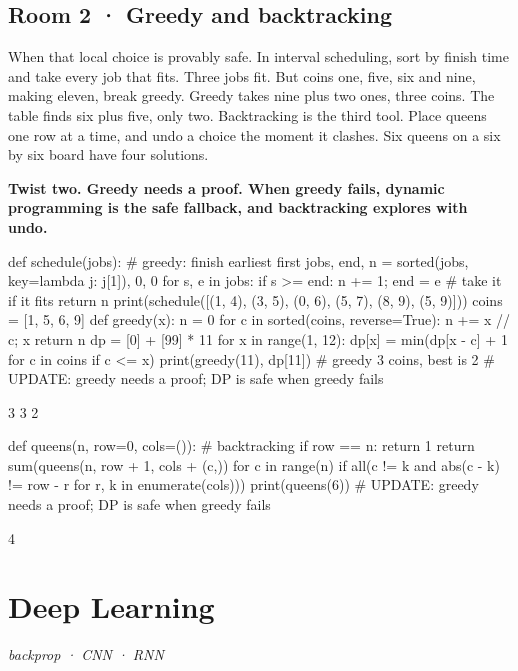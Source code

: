 \documentclass[11pt,a4paper]{report}
\begin{document}
\section*{Room 2 · Greedy and backtracking}
When that local choice is provably safe. In interval scheduling, sort by finish time and take every job that fits. Three jobs fit. But coins one, five, six and nine, making eleven, break greedy. Greedy takes nine plus two ones, three coins. The table finds six plus five, only two. Backtracking is the third tool. Place queens one row at a time, and undo a choice the moment it clashes. Six queens on a six by six board have four solutions.
\begin{tcolorbox}[colback=yellow!12,colframe=orange!70!black,boxrule=0.4pt,left=4pt,right=4pt,top=2pt,bottom=2pt]\textbf{Twist two. Greedy needs a proof. When greedy fails, dynamic programming is the safe fallback, and backtracking explores with undo.}\end{tcolorbox}
\begin{Code}
def schedule(jobs):                        # greedy: finish earliest first
    jobs, end, n = sorted(jobs, key=lambda j: j[1]), 0, 0
    for s, e in jobs:
        if s >= end: n += 1; end = e       # take it if it fits
    return n
print(schedule([(1, 4), (3, 5), (0, 6), (5, 7), (8, 9), (5, 9)]))
coins = [1, 5, 6, 9]
def greedy(x):
    n = 0
    for c in sorted(coins, reverse=True): n += x // c; x %
    return n
dp = [0] + [99] * 11
for x in range(1, 12): dp[x] = min(dp[x - c] + 1 for c in coins if c <= x)
print(greedy(11), dp[11])                  # greedy 3 coins, best is 2
# UPDATE: greedy needs a proof; DP is safe when greedy fails
\end{Code}
\begin{Out}
3
3 2
\end{Out}
\begin{Code}
def queens(n, row=0, cols=()):             # backtracking
    if row == n: return 1
    return sum(queens(n, row + 1, cols + (c,)) for c in range(n)
               if all(c != k and abs(c - k) != row - r for r, k in enumerate(cols)))
print(queens(6))
# UPDATE: greedy needs a proof; DP is safe when greedy fails
\end{Code}
\begin{Out}
4
\end{Out}
\chapter{Deep Learning}
\textit{backprop · CNN · RNN}
\end{document}
